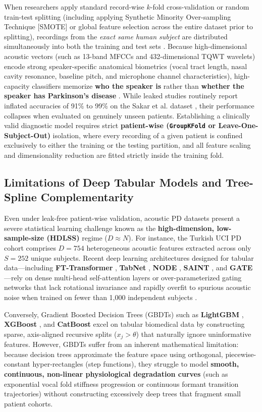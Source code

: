 \documentclass[journal,10pt,twoside]{IEEEtran}
\begin{document}
When researchers apply standard record-wise $k$-fold cross-validation or random train-test splitting (including applying Synthetic Minority Over-sampling Technique [SMOTE] or global feature selection across the entire dataset prior to splitting), recordings from the \textit{exact same human subject} are distributed simultaneously into both the training and test sets \cite{ref25,ref26,ref27,ref33}. Because high-dimensional acoustic vectors (such as 13-band MFCCs and 432-dimensional TQWT wavelets) encode strong speaker-specific anatomical biometrics (vocal tract length, nasal cavity resonance, baseline pitch, and microphone channel characteristics), high-capacity classifiers memorize \textbf{who the speaker is} rather than \textbf{whether the speaker has Parkinson's disease} \cite{ref34,ref35}. While leaked studies routinely report inflated accuracies of 91\% to 99\% on the Sakar et al. \cite{ref1} dataset \cite{ref23,ref24,ref25,ref27}, their performance collapses when evaluated on genuinely unseen patients. Establishing a clinically valid diagnostic model requires strict \textbf{patient-wise (\texttt{GroupKFold} or Leave-One-Subject-Out)} isolation, where every recording of a given patient is confined exclusively to either the training or the testing partition, and all feature scaling and dimensionality reduction are fitted strictly inside the training fold.

\subsection{Limitations of Deep Tabular Models and Tree-Spline Complementarity}
Even under leak-free patient-wise validation, acoustic PD datasets present a severe statistical learning challenge known as the \textbf{high-dimension, low-sample-size (HDLSS)} regime ($D \approx N$). For instance, the Turkish UCI PD cohort \cite{ref1} comprises $D = 754$ heterogeneous acoustic features extracted across only $S = 252$ unique subjects. Recent deep learning architectures designed for tabular data---including \textbf{FT-Transformer} \cite{ref11}, \textbf{TabNet} \cite{ref12}, \textbf{NODE} \cite{ref13}, \textbf{SAINT} \cite{ref14}, and \textbf{GATE} \cite{ref15}---rely on dense multi-head self-attention layers or over-parameterized gating networks that lack rotational invariance and rapidly overfit to spurious acoustic noise when trained on fewer than 1,000 independent subjects \cite{ref16}.

Conversely, Gradient Boosted Decision Trees (GBDTs) such as \textbf{LightGBM} \cite{ref8}, \textbf{XGBoost} \cite{ref9}, and \textbf{CatBoost} \cite{ref10} excel on tabular biomedical data by constructing sparse, axis-aligned recursive splits ($x_j > \theta$) that naturally ignore uninformative features. However, GBDTs suffer from an inherent mathematical limitation: because decision trees approximate the feature space using orthogonal, piecewise-constant hyper-rectangles (step functions), they struggle to model \textbf{smooth, continuous, non-linear physiological degradation curves} (such as exponential vocal fold stiffness progression or continuous formant transition trajectories) without constructing excessively deep trees that fragment small patient cohorts.
\end{document}

